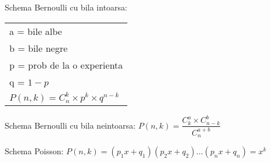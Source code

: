 \documentclass{article}
\begin{document}
Schema Bernoulli cu bila intoarsa:
\begin{tabular}{l}
  a = bile albe                                   \\
  b = bile negre                                  \\
  p = prob de la o experienta                     \\
  q = $1 - p$                                     \\
  $P(n, k) = C_{n}^{k} \times p^k \times q^{n-k}$ \\
\end{tabular}

Schema Bernoulli cu bila neintoarsa: $P(n, k) = \dfrac{C_{k}^{a} \times C_{n-k}^{b}}{C_{n}^{a+b}}$

Schema Poisson: $P(n, k) = (p_1x + q_1)(p_2x + q_2) \ldots (p_nx + q_n) = x^k$
\end{document}
